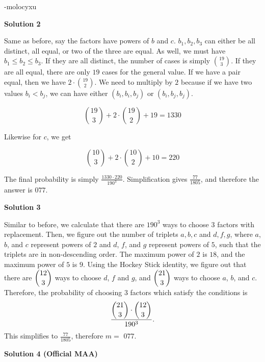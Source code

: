 \begin{enumerate}
 -molocyxu

 



\textbf{Solution 2}

Same as before, say the factors have powers of $b$ and $c$. $b_1, b_2, b_3$ can either be all distinct, all equal, or two of the three are equal. As well, we must have $b_1 \leq b_2 \leq b_3$. If they are all distinct, the number of cases is simply ${19 \choose 3}$. If they are all equal, there are only $19$ cases for the general value. If we have a pair equal, then we have $2 \cdot {19\choose 2}$. We need to multiply by $2$ because if we have two values $b_i < b_j$, we can have either $(b_i, b_i, b_j)$ or $(b_i, b_j, b_j)$. 

 
 \[{19 \choose 3} + 2 \cdot {19 \choose 2} + 19 = 1330\]

 Likewise for $c$, we get

 
 \[{10 \choose 3} + 2 \cdot {10 \choose 2} + 10 = 220\]

 The final probability is simply $\frac{1330 \cdot 220}{190^3}$. Simplification gives $\frac{77}{1805}$, and therefore the answer is $\boxed{077}$.

 



\textbf{Solution 3}

Similar to before, we calculate that there are $190^3$ ways to choose $3$ factors with replacement. Then, we figure out the number of triplets ${a,b,c}$ and ${d,f,g}$, where $a$, $b$, and $c$ represent powers of $2$ and $d$, $f$, and $g$ represent powers of $5$, such that the triplets are in non-descending order. The maximum power of $2$ is $18$, and the maximum power of $5$ is $9$. Using the Hockey Stick identity, we figure out that there are $\dbinom{12}{3}$ ways to choose $d$, $f$ and $g$, and $\dbinom{21}{3}$ ways to choose $a$, $b$, and $c$. Therefore, the probability of choosing $3$ factors which satisfy the conditions is 
 \[\frac{\dbinom{21}{3} \cdot \dbinom{12}{3}}{190^3}.\] This simplifies to $\frac{77}{1805}$, therefore $m =$ $\boxed{077}$.

 



\textbf{Solution 4 (Official MAA)}


\end{enumerate}

